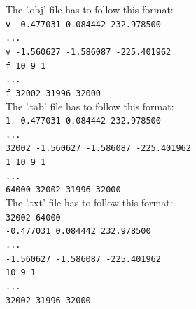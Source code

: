 The '.obj' file has to follow this format:\\
\verb|v -0.477031 0.084442 232.978500|\\
\verb|...|\\
\verb|v -1.560627 -1.586087 -225.401962|\\
\verb|f 10 9 1|\\
\verb|...|\\
\verb|f 32002 31996 32000|\\

The '.tab' file has to follow this format:\\
\verb|1 -0.477031 0.084442 232.978500|\\
\verb|...|\\
\verb|32002 -1.560627 -1.586087 -225.401962|\\
\verb|1 10 9 1|\\
\verb|...|\\
\verb|64000 32002 31996 32000|\\

The '.txt' file has to follow this format:\\
\verb|32002 64000|\\
\verb|-0.477031 0.084442 232.978500|\\
\verb|...|\\
\verb|-1.560627 -1.586087 -225.401962|\\
\verb|10 9 1|\\
\verb|...|\\
\verb|32002 31996 32000|\\
